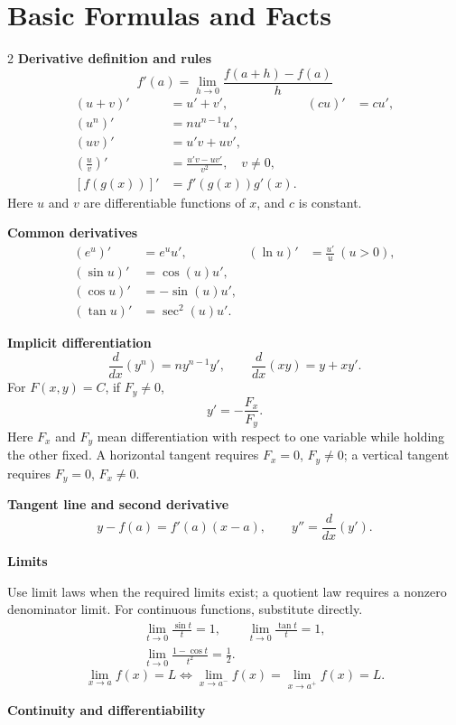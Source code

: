 \documentclass[11pt]{article}
\begin{document}
\section*{Basic Formulas and Facts}
\begin{multicols}{2}
\small
\textbf{Derivative definition and rules}
\[
  f'(a)=\lim_{h\to0}\frac{f(a+h)-f(a)}{h}
\]
\[
\begin{aligned}
  (u+v)'&=u'+v', & (cu)'&=cu',\\
  (u^n)'&=nu^{n-1}u',\\
  (uv)'&=u'v+uv',\\
  \left(\frac{u}{v}\right)'&=\frac{u'v-uv'}{v^2},\quad v\ne0,\\
  [f(g(x))]'&=f'(g(x))g'(x).
\end{aligned}
\]
Here $u$ and $v$ are differentiable functions of $x$, and $c$ is constant.

\medskip
\textbf{Common derivatives}
\[
\begin{aligned}
  (e^u)'&=e^u u', & (\ln u)'&=\frac{u'}{u}\ (u>0),\\
  (\sin u)'&=\cos(u)u',\\
  (\cos u)'&=-\sin(u)u',\\
  (\tan u)'&=\sec^2(u)u'.
\end{aligned}
\]

\textbf{Implicit differentiation}
\[
  \frac{d}{dx}(y^n)=ny^{n-1}y',\qquad
  \frac{d}{dx}(xy)=y+xy'.
\]
For $F(x,y)=C$, if $F_y\ne0$,
\[
  y'=-\frac{F_x}{F_y}.
\]
Here $F_x$ and $F_y$ mean differentiation with respect to one variable while
holding the other fixed. A horizontal tangent requires $F_x=0$, $F_y\ne0$;
a vertical tangent requires $F_y=0$, $F_x\ne0$.

\medskip
\textbf{Tangent line and second derivative}
\[
  y-f(a)=f'(a)(x-a),\qquad y''=\frac{d}{dx}(y').
\]

\columnbreak
\textbf{Limits}

Use limit laws when the required limits exist; a quotient law requires a
nonzero denominator limit. For continuous functions, substitute directly.
\[
\begin{gathered}
  \lim_{t\to0}\frac{\sin t}{t}=1,\qquad
  \lim_{t\to0}\frac{\tan t}{t}=1,\\
  \lim_{t\to0}\frac{1-\cos t}{t^2}=\frac12.
\end{gathered}
\]
\[
  \lim_{x\to a}f(x)=L
  \iff \lim_{x\to a^-}f(x)=\lim_{x\to a^+}f(x)=L.
\]

\textbf{Continuity and differentiability}


\end{multicols}
\end{document}
